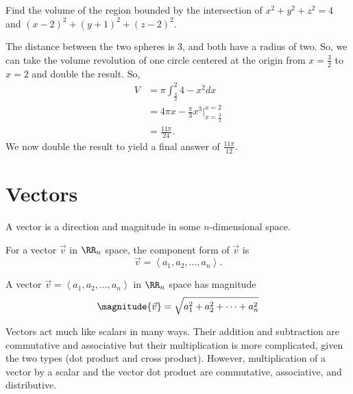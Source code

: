 \begin{example}
    Find the volume of the region bounded by the intersection of $x^{2} + y^{2} + z^{2} = 4$ and $(x - 2)^{2} + (y + 1)^{2} + (z - 2)^{2}$.

    \begin{soln}
        The distance between the two spheres is 3, and both have a radius of two. So, we can take the volume revolution of one circle centered at the origin from $x = \frac{3}{2}$ to $x = 2$ and double the result. So,
        \begin{align*}
            V &= \pi\int_{\frac{3}{2}}^{2} 4 - x^{2}dx \\
            &= 4\pi x - \frac{\pi}{3}x^{3} \biggr\rvert_{x = \frac{3}{2}}^{x = 2} \\
            &= \frac{11\pi}{24}.
        \end{align*}
        We now double the result to yield a final answer of $\frac{11\pi}{12}$.
    \end{soln}
\end{example}

\section{Vectors}

\begin{definition}[Vector]
    A vector is a direction and magnitude in some $n$-dimensional space.
\end{definition}

\begin{definition}
    For a vector $\vec{v}$ in $\RR_{n}$ space, the component form of $\vec{v}$ is
    \[\vec{v} = \left<a_{1}, a_{2}, \dots, a_{n}\right>.\]
\end{definition}

\begin{definition}
    A vector $\vec{v} = \left<a_{1}, a_{2}, \dots, a_{n}\right>$ in $\RR_{n}$ space has magnitude
    \[\magnitude{\vec{v}} = \sqrt{a_{1}^{2} + a_{2}^{2} + \cdots + a_{n}^{2}}\]
\end{definition}

\begin{remark}
    Vectors act much like scalars in many ways. Their addition and subtraction are commutative and associative but their multiplication is more complicated, given the two types (dot product and cross product). However, multiplication of a vector by a scalar and the vector dot product are commutative, associative, and distributive.
\end{remark}

